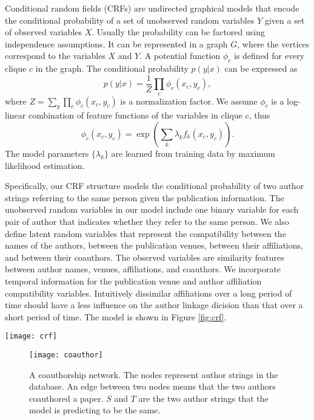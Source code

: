 \documentclass[twocolumn,letterpaper]{article}
\begin{document}
Conditional random fields (CRFs) are undirected graphical models that encode the conditional probability of a set of unobserved random variables $Y$ given a set of observed variables $X$.  Usually the probability can be factored using independence assumptions.  It can be represented in a graph $G$, where the vertices correspond to the variables $X$ and $Y$.  A potential function $\phi_c$ is defined for every clique $c$ in the graph.  The conditional probability $p(y|x)$ can be expressed as
$$p(y|x)=\frac{1}{Z}\prod_c \phi_c(x_c,y_c),$$
where $Z=\sum_y\prod_c \phi_c(x_c,y_c)$ is a normalization factor.  We assume $\phi_c$ is a log-linear combination of feature functions of the variables in clique $c$, thus
$$\phi_c(x_c,y_c)=\exp\left(\sum_k \lambda_k f_k(x_c,y_c)\right).$$
The model parameters $\{\lambda_k\}$ are learned from training data by maximum likelihood estimation.

Specifically, our CRF structure models the conditional probability of
two author strings referring to the same person given the publication
information.  The unobserved random variables in our model include one
binary variable for each pair of author that indicates whether they
refer to the same person.  We also define latent random variables that
represent the compatibility between the names of the authors, between
the publication venues, between their affiliations, and between their
coauthors.  The observed variables are similarity features
 between author names, venues, affiliations, and
coauthors.  We incorporate temporal information  for the publication venue and author affiliation
compatibility variables.   Intuitively
dissimilar affiliations over a long period of time should have a less
influence on the author linkage dicision than that over a short period
of time. The model is shown in Figure \ref{fig:crf}.

\begin{figure*}
\centering
\texttt{[image: crf]}
\caption{Our CRF model for the author linkage problem.  $A_i$ denotes
  the $i$th author string.  $A_i.n$, $A_i.v$, $A_i.aff$, and $A_i.ca$
  denote the name, venue, affiliation, and coauthors of $A_i$.  The
  oval nodes are unobserved random variables, and the box-shaped ones
  are observed variables.}
\label{fig:crf}
\end{figure*}


\begin{figure}
\centering
\texttt{[image: coauthor]}
\caption{A coauthorship network.  The nodes represent author strings
  in the database.  An edge between two nodes means that the two
  authors coauthored a paper.  $S$ and $T$ are the two author strings
  that the model is predicting to be the same.}
\label{fig:coauthor}
\end{figure}
\end{document}
